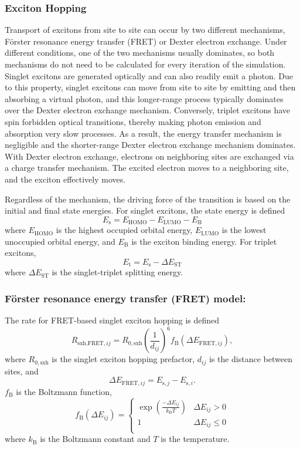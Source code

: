 \documentclass[%
 reprint,onecolumn,notitlepage,
superscriptaddress,longbibliography,
 amsmath,amssymb,
 aps,rmp,floatfix,
]{revtex4-1}
\begin{document}
\subsubsection{Exciton Hopping}

Transport of excitons from site to site can occur by two different mechanisms, F{\"o}rster resonance energy transfer (FRET)\cite{forster1948} or Dexter electron exchange.\cite{dexter1953jcp} 
Under different conditions, one of the two mechanisms usually dominates, so both mechanisms do not need to be calculated for every iteration of the simulation. 
Singlet excitons are generated optically and can also readily emit a photon. 
Due to this property, singlet excitons can move from site to site by emitting and then absorbing a virtual photon, and this longer-range process typically dominates over the Dexter electron exchange mechanism. 
Conversely, triplet excitons have spin forbidden optical transitions, thereby making photon emission and absorption very slow processes. 
As a result, the energy transfer mechanism is negligible and the shorter-range Dexter electron exchange mechanism dominates. 
With Dexter electron exchange, electrons on neighboring sites are exchanged via a charge transfer mechanism. 
The excited electron moves to a neighboring site, and the exciton effectively moves.

Regardless of the mechanism, the driving force of the transition is based on the initial and final state energies.
For singlet excitons, the state energy is defined
$$E_{\text{s}} = E_\text{HOMO} - E_\text{LUMO} - E_\text{B}$$
where $E_\text{HOMO}$ is the highest occupied orbital energy, $E_\text{LUMO}$ is the lowest unoccupied orbital energy, and $E_\text{B}$ is the exciton binding energy.
For triplet excitons, 
$$E_{\text{t}} = E_\text{s} - \Delta E_\text{ST}$$
where $\Delta E_\text{ST}$ is the singlet-triplet splitting energy.

\subsubsection*{\textbf{F{\"o}rster resonance energy transfer (FRET) model:}}

The rate for FRET-based singlet exciton hopping is defined
$$R_{\text{sxh,FRET},ij} = R_{0,\text{sxh}} \left( \frac{1}{d_{ij}} \right)^6 f_\text{B} \left( \Delta E_{\text{FRET},ij}\right),$$
where $R_{0,\text{sxh}}$ is the singlet exciton hopping prefactor, $d_{ij}$ is the distance between sites, and
$$\Delta E_{\text{FRET},ij} = E_{\text{s},j} - E_{\text{s},i}.$$
$f_\text{B}$ is the Boltzmann function,
$$f_\text{B} \left( \Delta E_{ij}\right) = \begin{cases}
\exp{\left( \frac{-\Delta E_{ij}}{k_\text{B} T} \right)} & \Delta E_{ij} > 0 \\
1 & \Delta E_{ij} \le 0 \\
\end{cases}$$
where $k_\text{B}$ is the Boltzmann constant and $T$ is the temperature.
\end{document}

